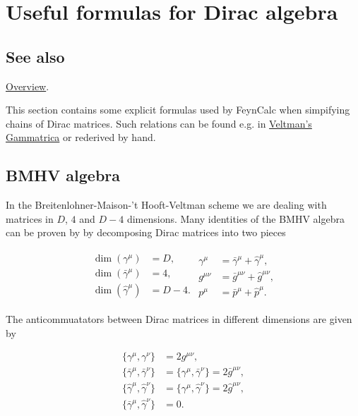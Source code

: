 \documentclass[../FeynCalcManual.tex]{subfiles}
\begin{document}
\hypertarget{useful formulas for dirac algebra}{
\section{Useful formulas for Dirac algebra}\label{useful formulas for dirac algebra}}

\subsection{See also}

\hyperlink{toc}{Overview}.

This section contains some explicit formulas used by FeynCalc when
simpifying chains of Dirac matrices. Such relations can be found e.g. in
\href{https:/XXX}{Veltman's Gammatrica} or rederived by hand.

\subsection{BMHV algebra}\label{bmhv-algebra}

In the Breitenlohner-Maison-'t Hooft-Veltman scheme we are dealing with
matrices in \(D\), \(4\) and \(D-4\) dimensions. Many identities of the
BMHV algebra can be proven by by decomposing Dirac matrices into two
pieces

\begin{align}
\begin{split}
\dim(\gamma^\mu) &= D, \\
\dim(\bar{\gamma}^\mu) &= 4, \\
\dim(\hat{\gamma}^\mu) &= D-4 .
\end{split}
\begin{split}
\gamma^\mu &= \bar{\gamma}^\mu +\hat{\gamma}^\mu, \\
g^{\mu \nu} &= \bar{g}^{\mu \nu} + \hat{g}^{\mu \nu}, \\
p^\mu & = \bar{p}^\mu + \hat{p}^\mu.
\end{split}
\end{align}

The anticommuatators between Dirac matrices in different dimensions are
given by

\begin{align}
\{ \gamma^\mu, \gamma^\nu \} &= 2 g^{\mu \nu}, \\
\{ \bar{\gamma}^\mu, \bar{\gamma}^\nu \} &= \{ \gamma^\mu, \bar{\gamma}^\nu \} = 2 \bar{g}^{\mu \nu}, \\
\{ \hat{\gamma}^\mu, \hat{\gamma}^\nu \} &= \{ \gamma^\mu, \hat{\gamma}^\nu \} = 2 \hat{g}^{\mu \nu}, \\
\{ \bar{\gamma}^\mu, \hat{\gamma}^\nu \} &= 0.
\end{align}
\end{document}
